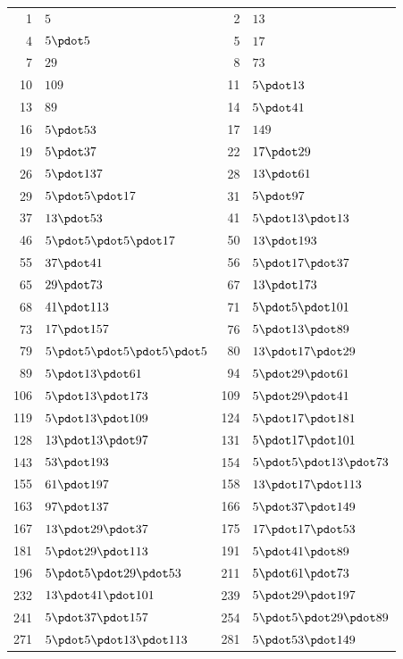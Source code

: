 \begin{longtable}{@{}r|l@{\qquad}r|l@{}}
1 & $5$ & 2 & $13$\\
4 & $5\pdot 5$ & 5 & $17$\\
7 & $29$ & 8 & $73$\\
10 & $109$ & 11 & $5\pdot 13$\\
13 & $89$ & 14 & $5\pdot 41$\\
16 & $5\pdot 53$ & 17 & $149$\\
19 & $5\pdot 37$ & 22 & $17\pdot 29$\\
26 & $5\pdot 137$ & 28 & $13\pdot 61$\\
29 & $5\pdot 5\pdot 17$ & 31 & $5\pdot 97$\\
37 & $13\pdot 53$ & 41 & $5\pdot 13\pdot 13$\\
46 & $5\pdot 5\pdot 5\pdot 17$ & 50 & $13\pdot 193$\\
55 & $37\pdot 41$ & 56 & $5\pdot 17\pdot 37$\\
65 & $29\pdot 73$ & 67 & $13\pdot 173$\\
68 & $41\pdot 113$ & 71 & $5\pdot 5\pdot 101$\\
73 & $17\pdot 157$ & 76 & $5\pdot 13\pdot 89$\\
79 & $5\pdot 5\pdot 5\pdot 5\pdot 5$ & 80 & $13\pdot 17\pdot 29$\\
89 & $5\pdot 13\pdot 61$ & 94 & $5\pdot 29\pdot 61$\\
106 & $5\pdot 13\pdot 173$ & 109 & $5\pdot 29\pdot 41$\\
119 & $5\pdot 13\pdot 109$ & 124 & $5\pdot 17\pdot 181$\\
128 & $13\pdot 13\pdot 97$ & 131 & $5\pdot 17\pdot 101$\\
143 & $53\pdot 193$ & 154 & $5\pdot 5\pdot 13\pdot 73$\\
155 & $61\pdot 197$ & 158 & $13\pdot 17\pdot 113$\\
163 & $97\pdot 137$ & 166 & $5\pdot 37\pdot 149$\\
167 & $13\pdot 29\pdot 37$ & 175 & $17\pdot 17\pdot 53$\\
181 & $5\pdot 29\pdot 113$ & 191 & $5\pdot 41\pdot 89$\\
196 & $5\pdot 5\pdot 29\pdot 53$ & 211 & $5\pdot 61\pdot 73$\\
232 & $13\pdot 41\pdot 101$ & 239 & $5\pdot 29\pdot 197$\\
241 & $5\pdot 37\pdot 157$ & 254 & $5\pdot 5\pdot 29\pdot 89$\\
271 & $5\pdot 5\pdot 13\pdot 113$ & 281 & $5\pdot 53\pdot 149$\\

\end{longtable}
